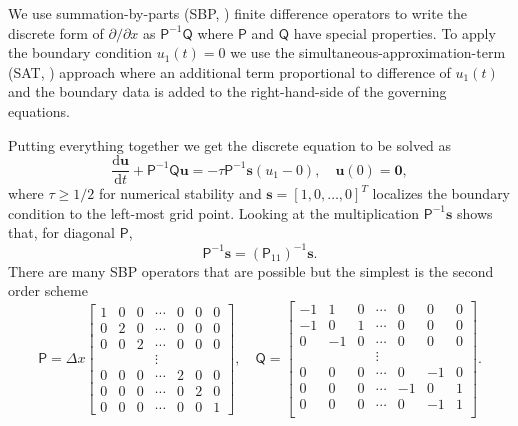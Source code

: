 \documentclass[11pt]{article}
\newcommand{\bvec}[1]{\ensuremath{\boldsymbol{#1}}}
\newcommand{\mat}[1]{\ensuremath{\mathsf{#1}}}
\begin{document}
We use summation-by-parts (SBP, \cite{strand:1994}) finite difference operators to write the discrete form of $\partial/\partial x$ as $\mat{P}^{-1} \mat{Q}$ where $\mat{P}$ and $\mat{Q}$ have special properties.  To apply the boundary condition $u_1(t) = 0$ we use the simultaneous-approximation-term (SAT, \cite{carpenter/etal:1994}) approach where an additional term proportional to difference of $u_1(t)$ and the boundary data is added to the right-hand-side of the governing equations.

Putting everything together we get the discrete equation to be solved as
\begin{equation}
\frac{\text{d}\bvec{u}}{\text{d}t} + \mat{P}^{-1} \mat{Q} \bvec{u} = -\tau \mat{P}^{-1} \bvec{s} (u_1 - 0), \quad \bvec{u}(0) = \bvec{0},
\label{eqn:discrete}
\end{equation}
where $\tau \ge 1/2$ for numerical stability and $\bvec{s} = [1, 0, \dots, 0]^T$ localizes the boundary condition to the left-most grid point.  Looking at the multiplication $\mat{P}^{-1} \bvec{s}$ shows that, for diagonal $\mat{P}$,
\begin{equation}
\mat{P}^{-1} \bvec{s} = (\mat{P}_{11})^{-1} \bvec{s}.
\end{equation}
There are many SBP operators that are possible but the simplest is the second order scheme
\begin{equation}
\mat{P} = \Delta x \begin{bmatrix} 1 & 0 & 0 & \cdots & 0 & 0 & 0 \\
                                   0 & 2 & 0 & \cdots & 0 & 0 & 0 \\
                                   0 & 0 & 2 & \cdots & 0 & 0 & 0 \\
                                     &   &   & \vdots &   &   &   \\
                                   0 & 0 & 0 & \cdots & 2 & 0 & 0 \\
                                   0 & 0 & 0 & \cdots & 0 & 2 & 0 \\
                                   0 & 0 & 0 & \cdots & 0 & 0 & 1 \end{bmatrix},
\quad
\mat{Q} = \begin{bmatrix} -1 &  1 &  0 & \cdots & 0 & 0 & 0 \\
                          -1 &  0 &  1 & \cdots & 0 & 0 & 0 \\
                           0 & -1 &  0 & \cdots & 0 & 0 & 0 \\
                             &    &    & \vdots &   &   & \\
                           0 &  0 &  0 & \cdots & 0 & -1 & 0 \\
                           0 &  0 &  0 & \cdots & -1 & 0 & 1 \\
                           0 &  0 &  0 & \cdots &  0 & -1 & 1 \\ \end{bmatrix}.
\label{eqn:sbp}
\end{equation}
\end{document}
